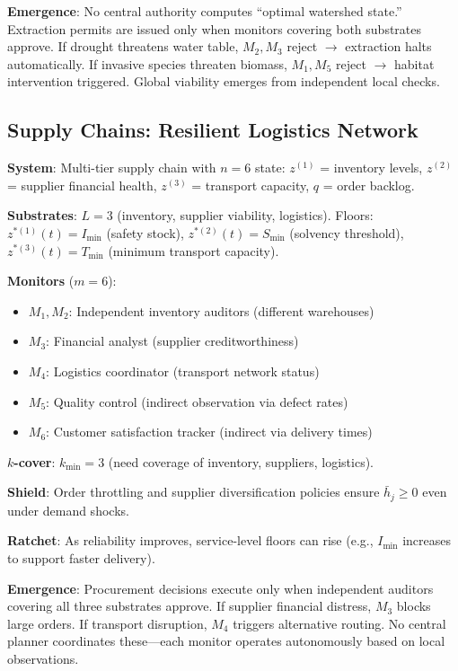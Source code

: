 \documentclass[11pt,a4paper]{article}
\theoremstyle{definition}
\begin{document}
\textbf{Emergence}: No central authority computes ``optimal watershed state.'' Extraction permits are issued only when monitors covering both substrates approve. If drought threatens water table, $M_2, M_3$ reject $\to$ extraction halts automatically. If invasive species threaten biomass, $M_1, M_5$ reject $\to$ habitat intervention triggered. Global viability emerges from independent local checks.

\subsection{Supply Chains: Resilient Logistics Network}

\textbf{System}: Multi-tier supply chain with $n = 6$ state: $z^{(1)}$ = inventory levels, $z^{(2)}$ = supplier financial health, $z^{(3)}$ = transport capacity, $q$ = order backlog.

\textbf{Substrates}: $L = 3$ (inventory, supplier viability, logistics). Floors: $z^{*(1)}(t) = I_{\min}$ (safety stock), $z^{*(2)}(t) = S_{\min}$ (solvency threshold), $z^{*(3)}(t) = T_{\min}$ (minimum transport capacity).

\textbf{Monitors} ($m = 6$):
\begin{itemize}
\item $M_1, M_2$: Independent inventory auditors (different warehouses)
\item $M_3$: Financial analyst (supplier creditworthiness)
\item $M_4$: Logistics coordinator (transport network status)
\item $M_5$: Quality control (indirect observation via defect rates)
\item $M_6$: Customer satisfaction tracker (indirect via delivery times)
\end{itemize}

\textbf{$k$-cover}: $k_{\min} = 3$ (need coverage of inventory, suppliers, logistics).

\textbf{Shield}: Order throttling and supplier diversification policies ensure $\bar{h}_j \geq 0$ even under demand shocks.

\textbf{Ratchet}: As reliability improves, service-level floors can rise (e.g., $I_{\min}$ increases to support faster delivery).

\textbf{Emergence}: Procurement decisions execute only when independent auditors covering all three substrates approve. If supplier financial distress, $M_3$ blocks large orders. If transport disruption, $M_4$ triggers alternative routing. No central planner coordinates these---each monitor operates autonomously based on local observations.
\end{document}
